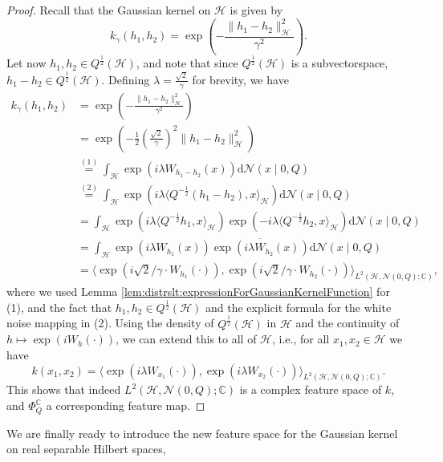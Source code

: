 \documentclass[letterpaper]{article} %
\newcommand{\fm}{\Phi} %
\newcommand{\hs}[1]{\mathcal{#1}} %
\newcommand{\Normal}{\mathcal{N}}
\newcommand{\C}{\mathbb{C}}
\newcommand{\stp}[2]{{\overset{(#2)}{#1}}}
\newcommand{\stpx}[1]{{(#1)}}
\begin{document}
\begin{proof}
    Recall that the Gaussian kernel on $\hs{H}$ is given by
    \begin{equation*}
        k_\gamma(h_1,h_2) = \exp\left(-\frac{\|h_1-h_2\|^2_\hs{H}}{\gamma^2}\right).
    \end{equation*}
    Let now $h_1,h_2\in Q^{\frac12}(\hs{H})$, and note that since $Q^{\frac12}(\hs{H})$ is a subvectorspace, $h_1-h_2\in Q^{\frac12}(\hs{H})$.
    Defining $\lambda=\frac{\sqrt{2}}{\gamma}$ for brevity, we have
    \begin{align*}
        k_\gamma(h_1,h_2) & = \exp\left(-\frac{\|h_1-h_2\|_\hs{H}^2}{\gamma^2}\right) \\
        & =  \exp\left(-\frac12 \left(\frac{\sqrt{2}}{\gamma}\right)^2 \|h_1-h_2\|_\hs{H}^2\right) \\
        & \stp{=}{1} \int_\hs{H} \exp(i \lambda W_{h_1-h_2}(x))\mathrm{d}\Normal(x\mid 0, Q) \\
        & \stp{=}{2} \int_\hs{H} \exp(i \lambda \langle Q^{-\frac12}(h_1-h_2), x\rangle_\hs{H}) \mathrm{d}\Normal(x\mid 0, Q) \\
        & = \int_\hs{H} \exp(i \lambda \langle Q^{-\frac12}h_1,x\rangle_\hs{H}) \exp(-i\lambda \langle Q^{-\frac12}h_2,x\rangle_\hs{H}) \mathrm{d}\Normal(x\mid 0, Q) \\
        & = \int_\hs{H} \exp(i \lambda W_{h_1}(x)) \overline{\exp(i\lambda W_{h_2}(x))} \mathrm{d}\Normal(x\mid 0, Q) \\
        & = \langle  \exp(i \sqrt{2}/\gamma \cdot W_{h_1}(\cdot)),  \exp(i \sqrt{2}/\gamma \cdot W_{h_2}(\cdot))\rangle_{L^2(\hs{H},\Normal(0,Q);\C)},
    \end{align*}
    where we used Lemma \ref{lem:distrslt:expressionForGaussianKernelFunction} for \stpx{1}, 
    and the fact that $h_1,h_2\in Q^{\frac12}(\hs{H})$ and the explicit formula for the white noise mapping in \stpx{2}.
    Using the density of $Q^{\frac12}(\hs{H})$ in $\hs{H}$ and the continuity of  $h \mapsto \exp(iW_h(\cdot))$,
    we can extend this to all of $\hs{H}$, i.e., for all $x_1,x_2\in\hs{H}$ we have
    \begin{equation*}
        k(x_1,x_2) = \langle  \exp(i \lambda W_{x_1}(\cdot)),  \exp(i \lambda W_{x_2}(\cdot))\rangle_{L^2(\hs{H},\Normal(0,Q);\C)}.
    \end{equation*}
    This shows that indeed $L^2(\hs{H},\Normal(0,Q);\C)$ is a complex feature space of $k$, and $\fm_Q^\C$ a corresponding feature map.
\end{proof}
We are finally ready to introduce the new feature space for the Gaussian kernel on real separable Hilbert spaces,
\end{document}
